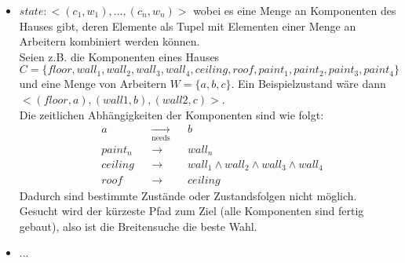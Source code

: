 \documentclass[12pt, paper=a4]{article}
\begin{document}
\begin{itemize}
\item $state: <(c_1, w_1), ..., (c_n, w_n)>$ wobei es eine Menge an Komponenten des Hauses gibt,
      deren Elemente als Tupel mit Elementen einer Menge an Arbeitern kombiniert werden können.\\
      Seien z.B. die Komponenten eines Hauses\\
      $C=\{floor, wall_1, wall_2, wall_3, wall_4, ceiling, roof, paint_1, paint_2,
      paint_3, paint_4\}$ und eine Menge von Arbeitern $W=\{a, b, c\}$.
      Ein Beispielzustand wäre dann $<(floor, a), (wall 1, b), (wall 2, c)>$.\\
      Die zeitlichen Abhängigkeiten der Komponenten sind wie folgt:\\
	  \begin{align*}       
      &a       && \underset{\text{needs}}{\longrightarrow} && b\\
      &paint_n && \longrightarrow && wall_n\\
      &ceiling && \longrightarrow && wall_1 \wedge wall_2 \wedge wall_3 \wedge wall_4\\
      &roof    && \longrightarrow && ceiling
      \end{align*}
      Dadurch sind bestimmte Zustände oder Zustandsfolgen nicht möglich.\\
      Gesucht wird der kürzeste Pfad zum Ziel (alle Komponenten sind fertig gebaut), also ist die
      Breitensuche die beste Wahl.

\item ...
\end{itemize}
\end{document}
